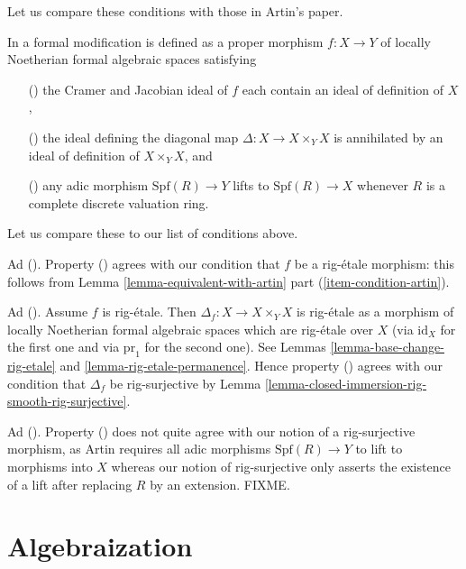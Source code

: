 \noindent
Let us compare these conditions with those in Artin's paper.

\begin{remark}
\label{remark-compare-formal-modification-artin}
In \cite[Definition 1.7]{ArtinII} a formal modification is defined as a
proper morphism $f : X \to Y$ of locally Noetherian formal algebraic spaces
satisfying
\begin{enumerate}
\item[(\romannumeral1)] the Cramer and Jacobian ideal of
$f$ each contain an ideal of definition of $X$,
\item[(\romannumeral2)] the ideal defining the
diagonal map $\Delta : X \to X \times_Y X$
is annihilated by an ideal of definition of $X \times_Y X$, and
\item[(\romannumeral3)] any adic morphism $\text{Spf}(R) \to Y$
lifts to $\text{Spf}(R) \to X$ whenever $R$ is a
complete discrete valuation ring.
\end{enumerate}
Let us compare these to our list of conditions above.

\medskip\noindent
Ad (). Property () agrees with our condition
that $f$ be a rig-\'etale morphism: this follows from
Lemma \ref{lemma-equivalent-with-artin} part (\ref{item-condition-artin}).

\medskip\noindent
Ad (). Assume $f$ is rig-\'etale. Then
$\Delta_f : X \to X \times_Y X$ is rig-\'etale as a morphism
of locally Noetherian formal algebraic spaces which are
rig-\'etale over $X$ (via $\text{id}_X$ for the first one and via
$\text{pr}_1$ for the second one).
See Lemmas \ref{lemma-base-change-rig-etale} and
\ref{lemma-rig-etale-permanence}.
Hence property () agrees with our condition
that $\Delta_f$ be rig-surjective by
Lemma \ref{lemma-closed-immersion-rig-smooth-rig-surjective}.

\medskip\noindent
Ad (). Property () does not quite
agree with our notion of a rig-surjective morphism, as Artin
requires all adic morphisms $\text{Spf}(R) \to Y$ to lift to
morphisms into $X$ whereas our notion of rig-surjective only
asserts the existence of a lift after replacing $R$ by an extension.
FIXME.
\end{remark}









\section{Algebraization}
\label{section-algebraization}

